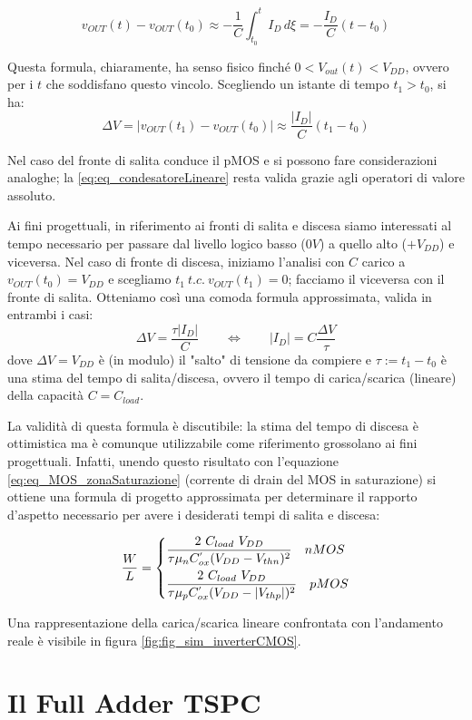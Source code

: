 \begin{equation}
v_{OUT}(t) - v_{OUT}(t_0) \approx - \frac{1}{C}\int_{t_0}^{t} I_D \, d\xi = - \frac{I_D}{C}(t - t_0)
\label{eq:eq_condensatoreSoluzioneLineare}
\end{equation}

Questa formula, chiaramente, ha senso fisico finché $0 < V_{out}(t) < V_{DD}$, ovvero per i $t$ che soddisfano questo vincolo. Scegliendo un istante di tempo $t_1 > t_0$, si ha:
\begin{equation}
\Delta V = \left | v_{OUT}(t_1) - v_{OUT}(t_0) \right | \approx \frac{\left | I_D \right | }{C}(t_1 - t_0)
\label{eq:eq_condesatoreLineare}
\end{equation}

Nel caso del fronte di salita conduce il pMOS e si possono fare considerazioni analoghe; la \ref{eq:eq_condesatoreLineare} resta valida grazie agli operatori di valore assoluto.

Ai fini progettuali, in riferimento ai fronti di salita e discesa siamo interessati al tempo necessario per passare dal livello logico basso ($0V$) a quello alto  ($+V_{DD}$) e viceversa. Nel caso di fronte di discesa, iniziamo l'analisi con $C$ carico a $v_{OUT}(t_0) = V_{DD}$ e scegliamo $t_1 \ t.c. \ v_{OUT}(t_1) = 0$; facciamo il viceversa con il fronte di salita. Otteniamo così una comoda formula approssimata, valida in entrambi i casi:
\begin{equation}
\Delta V = \frac{\tau \left | I_D \right |}{C} \qquad \Leftrightarrow \qquad \left | I_D \right | = C \frac{\Delta V}{\tau}
\label{eq:eq_condensatoreLineareFinale}
\end{equation}
dove $\Delta V = V_{DD}$ è (in modulo) il "salto" di tensione da compiere e $\tau := t_1 - t_0$ è una stima del tempo di salita/discesa, ovvero il tempo di carica/scarica (lineare) della capacità $C = C_{load}$.

La validità di questa formula è discutibile: la stima del tempo di discesa è ottimistica ma è comunque utilizzabile come riferimento grossolano ai fini progettuali. Infatti, unendo questo risultato con l'equazione \ref{eq:eq_MOS_zonaSaturazione} (corrente di drain del MOS in saturazione) si ottiene una formula di progetto approssimata per determinare il rapporto d'aspetto necessario per avere i desiderati tempi di salita e discesa:

\begin{equation}
\frac{W}{L} =
\begin{dcases}
\frac{2 \ C_{load} \ V_{DD}}{\tau \mu _{n} C^{'}_{ox} (V_{DD}-V_{thn})^2} \quad nMOS\\
\frac{2\ C_{load} \ V_{DD}}{\tau \mu _{p} C^{'}_{ox} (V_{DD}-|V_{thp}|)^2} \quad pMOS
\end{dcases}
\label{eq:formulaRapportoAspetto}
\end{equation}

Una rappresentazione della carica/scarica lineare confrontata con l'andamento reale è visibile in figura \ref{fig:fig_sim_inverterCMOS}.

\section{Il Full Adder TSPC}
\label{sec:sec_fullAdder}







